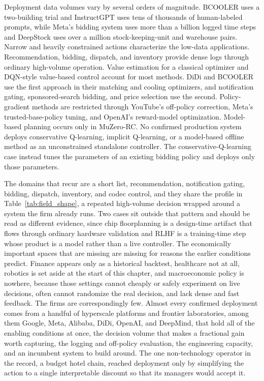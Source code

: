 Deployment data volumes vary by several orders of magnitude. BCOOLER uses a two-building trial and InstructGPT uses tens of thousands of human-labeled prompts, while Meta's bidding system uses more than a billion logged time steps and DeepStock uses over a million stock-keeping-unit and warehouse pairs. Narrow and heavily constrained actions characterize the low-data applications. Recommendation, bidding, dispatch, and inventory provide dense logs through ordinary high-volume operation. Value estimation for a classical optimizer and DQN-style value-based control account for most methods. DiDi and BCOOLER use the first approach in their matching and cooling optimizers, and notification gating, sponsored-search bidding, and price selection use the second. Policy-gradient methods are restricted through YouTube's off-policy correction, Meta's trusted-base-policy tuning, and OpenAI's reward-model optimization. Model-based planning occurs only in MuZero-RC. No confirmed production system deploys conservative Q-learning, implicit Q-learning, or a model-based offline method as an unconstrained standalone controller. The conservative-Q-learning case instead tunes the parameters of an existing bidding policy and deploys only those parameters.

The domains that recur are a short list, recommendation, notification gating, bidding, dispatch, inventory, and codec control, and they share the profile in Table~\ref{tab:field_shape}, a repeated high-volume decision wrapped around a system the firm already runs. Two cases sit outside that pattern and should be read as different evidence, since chip floorplanning is a design-time artifact that flows through ordinary hardware validation and RLHF is a training-time step whose product is a model rather than a live controller. The economically important spaces that are missing are missing for reasons the earlier conditions predict. Finance appears only as a historical backtest, healthcare not at all, robotics is set aside at the start of this chapter, and macroeconomic policy is nowhere, because those settings cannot cheaply or safely experiment on live decisions, often cannot randomize the real decision, and lack dense and fast feedback. The firms are correspondingly few. Almost every confirmed deployment comes from a handful of hyperscale platforms and frontier laboratories, among them Google, Meta, Alibaba, DiDi, OpenAI, and DeepMind, that hold all of the enabling conditions at once, the decision volume that makes a fractional gain worth capturing, the logging and off-policy evaluation, the engineering capacity, and an incumbent system to build around. The one non-technology operator in the record, a budget hotel chain, reached deployment only by simplifying the action to a single interpretable discount so that its managers would accept it.

